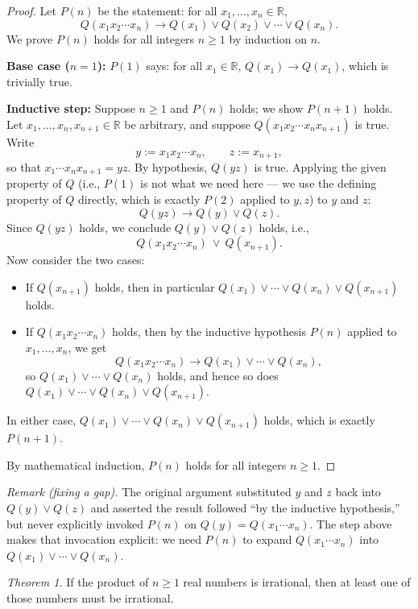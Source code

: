 \documentclass[11pt]{article}
\newcommand{\R}{\mathbb{R}}
\newcommand{\partlabel}[1]{%
    \noindent\makebox[2em][l]{\textbf{(#1)}}%
}
\begin{document}
\begin{proof}
Let $P(n)$ be the statement: for all $x_1, \dots, x_n \in \R$,
\[
Q(x_1 x_2 \cdots x_n) \rightarrow Q(x_1) \vee Q(x_2) \vee \cdots \vee Q(x_n).
\]
We prove $P(n)$ holds for all integers $n \ge 1$ by induction on $n$.

\textbf{Base case ($n=1$):} $P(1)$ says: for all $x_1 \in \R$, $Q(x_1) \rightarrow Q(x_1)$, which is trivially true.

\textbf{Inductive step:} Suppose $n \ge 1$ and $P(n)$ holds; we show $P(n+1)$ holds. Let $x_1, \dots, x_n, x_{n+1} \in \R$ be arbitrary, and suppose $Q(x_1 x_2 \cdots x_n x_{n+1})$ is true. Write
\[
y := x_1 x_2 \cdots x_n, \qquad z := x_{n+1},
\]
so that $x_1 \cdots x_n x_{n+1} = yz$. By hypothesis, $Q(yz)$ is true. Applying the given property of $Q$ (i.e., $P(1)$ is not what we need here --- we use the defining property of $Q$ directly, which is exactly $P(2)$ applied to $y,z$) to $y$ and $z$:
\[
Q(yz) \rightarrow Q(y) \vee Q(z).
\]
Since $Q(yz)$ holds, we conclude $Q(y) \vee Q(z)$ holds, i.e.,
\[
Q(x_1 x_2 \cdots x_n) \ \vee\ Q(x_{n+1}).
\]
Now consider the two cases:
\begin{itemize}
\item If $Q(x_{n+1})$ holds, then in particular $Q(x_1) \vee \cdots \vee Q(x_n) \vee Q(x_{n+1})$ holds.
\item If $Q(x_1 x_2 \cdots x_n)$ holds, then by the inductive hypothesis $P(n)$ applied to $x_1,\dots,x_n$, we get
\[
Q(x_1 x_2 \cdots x_n) \rightarrow Q(x_1) \vee \cdots \vee Q(x_n),
\]
so $Q(x_1) \vee \cdots \vee Q(x_n)$ holds, and hence so does $Q(x_1) \vee \cdots \vee Q(x_n) \vee Q(x_{n+1})$.
\end{itemize}
In either case, $Q(x_1) \vee \cdots \vee Q(x_n) \vee Q(x_{n+1})$ holds, which is exactly $P(n+1)$.

By mathematical induction, $P(n)$ holds for all integers $n \ge 1$.
\end{proof}

\medskip
\noindent\emph{Remark (fixing a gap).} The original argument substituted $y$ and $z$ back into $Q(y) \vee Q(z)$ and asserted the result followed ``by the inductive hypothesis,'' but never explicitly invoked $P(n)$ on $Q(y) = Q(x_1 \cdots x_n)$. The step above makes that invocation explicit: we need $P(n)$ to expand $Q(x_1\cdots x_n)$ into $Q(x_1) \vee \cdots \vee Q(x_n)$.

\bigskip
\partlabel{b}
\emph{Theorem 1.} If the product of $n \ge 1$ real numbers is irrational, then at least one of those numbers must be irrational.
\end{document}
